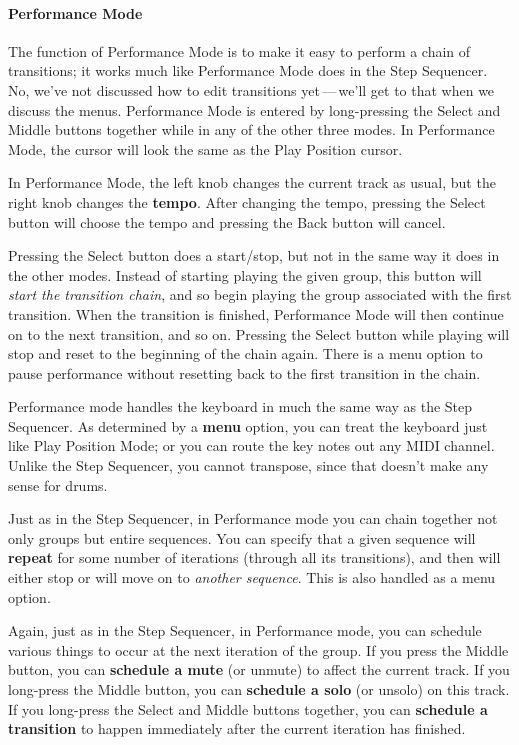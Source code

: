 \documentclass{article}
\begin{document}
\paragraph{Performance Mode}  The function of Performance Mode is to make it easy to perform a chain of transitions; it works much like Performance Mode does in the Step Sequencer. No, we've not discussed how to edit transitions yet\,---\,we'll get to that when we discuss the menus.  Performance Mode is entered by long-pressing the Select and Middle buttons together while in any of the other three modes.  In Performance Mode, the cursor will look the same as the Play Position cursor.

In Performance Mode, the left knob changes the current track as usual, but the right knob changes the {\bf tempo}.  After changing the tempo, pressing the Select button will choose the tempo and pressing the Back button will cancel.  

Pressing the Select button does a start/stop, but not in the same way it does in the other modes.  Instead of starting playing the given group, this button will {\it start the transition chain}, and so begin playing the group associated with the first transition.  When the transition is finished, Performance Mode will then continue on to the next transition, and so on.   Pressing the Select button while playing will stop and reset to the beginning of the chain again.  There is a menu option to pause performance without resetting back to the first transition in the chain.

Performance mode handles the keyboard in much the same way as the Step Sequencer.  As determined by a {\bf menu} option, you can treat the keyboard just like Play Position Mode; or you can route the key notes out any MIDI channel.  Unlike the Step Sequencer, you cannot transpose, since that doesn't make any sense for drums.

Just as in the Step Sequencer, in Performance mode you can chain together not only groups but entire sequences.  You can specify that a given sequence will {\bf repeat} for some number of iterations (through all its transitions), and then will either stop or will move on to {\it another sequence}.  This is also handled as a menu option.

Again, just as in the Step Sequencer, in Performance mode, you can schedule various things to occur at the next iteration of the group.  If you press the Middle button, you can {\bf schedule a mute} (or unmute) to affect the current track.  If you long-press the Middle button, you can {\bf schedule a solo} (or unsolo) on this track.  If you long-press the Select and Middle buttons together, you can {\bf schedule a transition} to happen immediately after the current iteration has finished.
\end{document}
